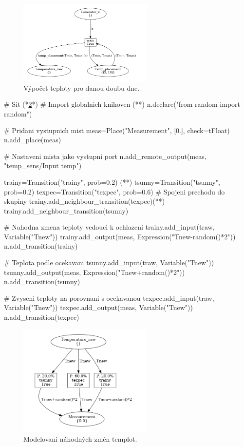 \begin{figure}[htb]
  \centering
  \includegraphics[width=0.6\textwidth]{obrazky-figures/calc.png}
  \caption{Výpočet teploty pro danou doubu dne.}
  \label{therm-calc-viz}
\end{figure}

\begin{python}
  # Sit (*\ref{prob-ev-viz}*)
  # Import globalnich knihoven (*\label{code:prob-ev-draw}*)
  n.declare("from random import random")

  # Pridani vystupnich mist
  meas=Place("Measurement", [0.], check=tFloat)
  n.add_place(meas)

  # Nastaveni mista jako vystupni port
  n.add_remote_output(meas, "temp_sens/Input temp")

  trainy=Transition("trainy", prob=0.2) (*\label{code:prob-temp-example}*)
  tsunny=Transition("tsunny", prob=0.2)
  texpec=Transition("texpec", prob=0.6)
  # Spojeni prechodu do skupiny
  trainy.add_neighbour_transition(texpec)(*\label{code:prob-temp-neghb-example}*)
  trainy.add_neighbour_transition(tsunny)

  # Nahodna zmena teploty vedouci k ochlazeni
  trainy.add_input(traw, Variable("Tnew"))
  trainy.add_output(meas, Expression("Tnew-random()*2"))
  n.add_transition(trainy)

  # Teplota podle ocekavani
  tsunny.add_input(traw, Variable("Tnew"))
  tsunny.add_output(meas, Expression("Tnew+random()*2"))
  n.add_transition(tsunny)

  # Zvyseni teploty na porovnani s ocekavanou
  texpec.add_input(traw, Variable("Tnew"))
  texpec.add_output(meas, Variable("Tnew"))
  n.add_transition(texpec)
\end{python}

\begin{figure}[htb]
  \centering
  \includegraphics[width=0.6\textwidth]{obrazky-figures/measure.png}
  \caption{Modelovaní náhodných změn templot.}
  \label{prob-ev-viz}
\end{figure}

